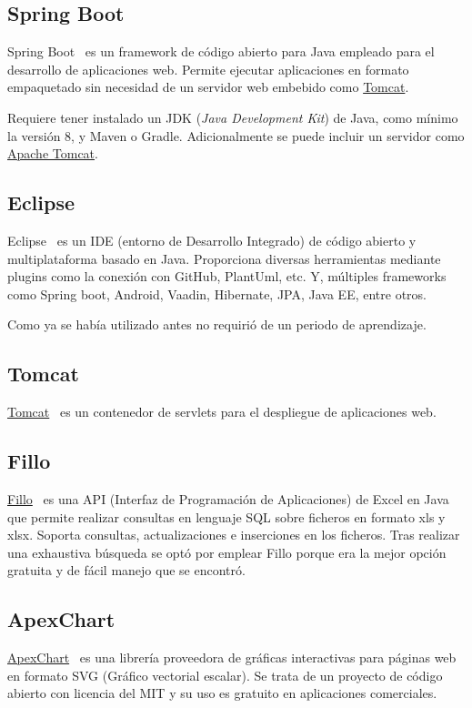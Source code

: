 \subsection{Spring Boot}
Spring Boot~\cite{pagina_springBoot} es un framework de código abierto para Java empleado para el desarrollo de aplicaciones web. Permite ejecutar aplicaciones en formato empaquetado sin necesidad de un servidor web embebido como \href{https://tomcat.apache.org/}{Tomcat}.

Requiere tener instalado un JDK (\textit{Java Development Kit}) de Java, como mínimo la versión 8, y Maven o Gradle. Adicionalmente se puede incluir un servidor como \href{https://tomcat.apache.org/}{Apache Tomcat}.

\subsection{Eclipse}
Eclipse~\cite{pagina_eclipse} es un IDE (entorno de Desarrollo Integrado) de código abierto y multiplataforma basado en Java. Proporciona diversas herramientas mediante plugins como la conexión con GitHub, PlantUml, etc. Y, múltiples frameworks como Spring boot, Android, Vaadin, Hibernate, JPA, Java EE, entre otros.

Como ya se había utilizado antes no requirió de un periodo de aprendizaje.

\subsection{Tomcat}
\href{https://tomcat.apache.org/download-90.cgi}{Tomcat}~\cite{pagina_tomcat} es un contenedor de servlets para el despliegue de aplicaciones web. 

\subsection{Fillo}
\href{https://codoid.com/fillo/}{Fillo}~\cite{pagina_fillo} es una API (Interfaz de Programación de Aplicaciones) de Excel en Java que permite realizar consultas en lenguaje SQL sobre ficheros en formato xls y xlsx. Soporta consultas, actualizaciones e inserciones en los ficheros.  Tras realizar una exhaustiva búsqueda se optó por emplear Fillo porque era la mejor opción gratuita y de fácil manejo que se encontró.

\subsection{ApexChart}
\href{https://apexcharts.com/}{ApexChart}~\cite{pagina_ApexChart} es una librería proveedora de gráficas interactivas para páginas web en formato SVG (Gráfico vectorial escalar).
Se trata de un proyecto de código abierto con licencia del MIT y su uso es gratuito en aplicaciones comerciales.

